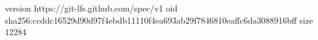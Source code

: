version https://git-lfs.github.com/spec/v1
oid sha256:ccddc16529d90d97f4ebdb11110f4ea693ab29f7846810eaffc6da3088916bff
size 12284
